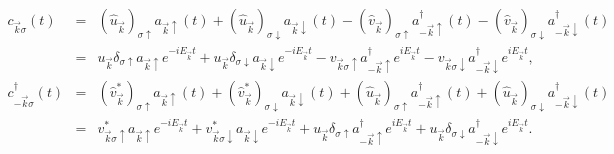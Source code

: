 \documentclass[uplatex,a4j,12pt,dvipdfmx]{jsarticle}
\begin{document}
\begin{eqnarray}
	c_{\vec{k} \sigma}(t)
	&=&
	(\hat{u}_{\vec{k}})_{\sigma \uparrow} a_{\vec{k} \uparrow}(t)
	+
	(\hat{u}_{\vec{k}})_{\sigma \downarrow} a_{\vec{k} \downarrow}(t)
	-
	(\hat{v}_{\vec{k}})_{\sigma \uparrow} a_{-\vec{k} \uparrow}^{\dagger}(t)
	-
	(\hat{v}_{\vec{k}})_{\sigma \downarrow} a_{-\vec{k} \downarrow}^{\dagger}(t)
	\nonumber \\[2mm] &=&
	u_{\vec{k}} \delta_{\sigma \uparrow} a_{\vec{k} \uparrow} e^{- i E_{\vec{k}} t}
	+
	u_{\vec{k}} \delta_{\sigma \downarrow} a_{\vec{k} \downarrow} e^{- i E_{\vec{k}} t}
	-
	v_{\vec{k} \sigma \uparrow} a_{-\vec{k} \uparrow}^{\dagger} e^{ i E_{\vec{k}} t}
	-
	v_{\vec{k} \sigma \downarrow} a_{-\vec{k} \downarrow}^{\dagger} e^{ i E_{\vec{k}} t}
	,
	\\[4mm]
	c_{-\vec{k} \sigma}^{\dagger}(t)
	&=&
	(\hat{v}_{\vec{k}}^{*})_{\sigma \uparrow} a_{\vec{k} \uparrow}(t)
	+
	(\hat{v}_{\vec{k}}^{*})_{\sigma \downarrow} a_{\vec{k} \downarrow}(t)
	+
	(\hat{u}_{\vec{k}})_{\sigma \uparrow} a_{-\vec{k} \uparrow}^{\dagger}(t)
	+
	(\hat{u}_{\vec{k}})_{\sigma \downarrow} a_{-\vec{k} \downarrow}^{\dagger}(t)
	\nonumber \\[2mm] &=&
	v_{\vec{k} \sigma \uparrow}^{*} a_{\vec{k} \uparrow} e^{- i E_{\vec{k}} t}
	+
	v_{\vec{k} \sigma \downarrow}^{*} a_{\vec{k} \downarrow} e^{- i E_{\vec{k}} t}
	+
	u_{\vec{k}} \delta_{\sigma \uparrow} a_{-\vec{k} \uparrow}^{\dagger} e^{ i E_{\vec{k}} t}
	+
	u_{\vec{k}} \delta_{\sigma \downarrow} a_{-\vec{k} \downarrow}^{\dagger} e^{ i E_{\vec{k}} t}
	.
\end{eqnarray}
\end{document}
